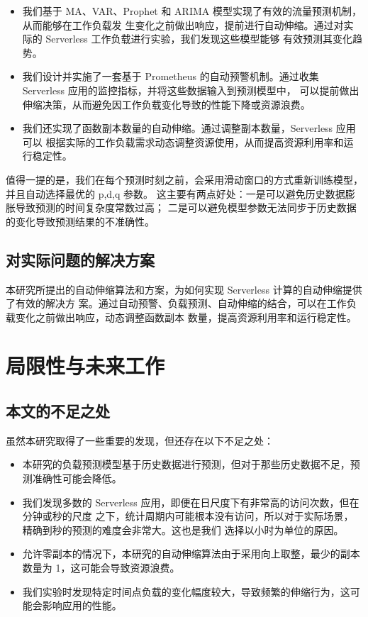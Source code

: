 \documentclass[a4paper,AutoFakeBold,oneside,12pt]{book}
\begin{document}
\begin{itemize}
	\item 我们基于 MA、VAR、Prophet 和 ARIMA 模型实现了有效的流量预测机制，从而能够在工作负载发
	生变化之前做出响应，提前进行自动伸缩。通过对实际的 Serverless 工作负载进行实验，我们发现这些模型能够
	有效预测其变化趋势。
	
	\item 我们设计并实施了一套基于 Prometheus 的自动预警机制。通过收集 
	Serverless 应用的监控指标，并将这些数据输入到预测模型中，
	可以提前做出伸缩决策，从而避免因工作负载变化导致的性能下降或资源浪费。
	
	\item 我们还实现了函数副本数量的自动伸缩。通过调整副本数量，Serverless 应用可以
	根据实际的工作负载需求动态调整资源使用，从而提高资源利用率和运行稳定性。
\end{itemize}

值得一提的是，我们在每个预测时刻之前，会采用滑动窗口的方式重新训练模型，并且自动选择最优的 p,d,q 参数。
这主要有两点好处：一是可以避免历史数据膨胀导致预测的时间复杂度常数过高；
二是可以避免模型参数无法同步于历史数据的变化导致预测结果的不准确性。

\subsection{对实际问题的解决方案}
本研究所提出的自动伸缩算法和方案，为如何实现 Serverless 计算的自动伸缩提供了有效的解决方
案。通过自动预警、负载预测、自动伸缩的结合，可以在工作负载变化之前做出响应，动态调整函数副本
数量，提高资源利用率和运行稳定性。

\section{局限性与未来工作}
\subsection{本文的不足之处}
虽然本研究取得了一些重要的发现，但还存在以下不足之处：

\begin{itemize}
	\item 本研究的负载预测模型基于历史数据进行预测，但对于那些历史数据不足，预测准确性可能会降低。
	
	\item 我们发现多数的 Serverless 应用，即便在日尺度下有非常高的访问次数，但在分钟或秒的尺度
	之下，统计周期内可能根本没有访问，所以对于实际场景，精确到秒的预测的难度会非常大。这也是我们
	选择以小时为单位的原因。

	\item 允许零副本的情况下，本研究的自动伸缩算法由于采用向上取整，最少的副本数量为 1，这可能会导致资源浪费。

	\item 我们实验时发现特定时间点负载的变化幅度较大，导致频繁的伸缩行为，这可能会影响应用的性能。

\end{itemize}
\end{document}
